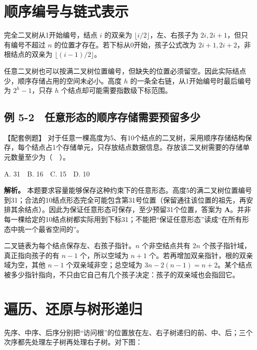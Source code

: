 \section{顺序编号与链式表示}\label{DS05-03}

完全二叉树从1开始编号，结点 \(i\) 的双亲为 \(\lfloor i/2\rfloor\)，左、右孩子为 \(2i,2i+1\)，但只有编号不超过 \(n\) 的位置才存在。若下标从0开始，孩子公式改为 \(2i+1,2i+2\)，非根结点的双亲为 \(\lfloor(i-1)/2\rfloor\)。

任意二叉树也可以按满二叉树位置编号，但缺失的位置必须留空。因此实际结点少，顺序存储占用的空间未必小。高度 \(h\) 的一条全右链，从1开始编号时最后编号为 \(2^h-1\)，只存 \(h\) 个结点却可能需要指数级下标范围。

\subsection{例 5-2　任意形态的顺序存储需要预留多少}\label{DS05-ex2}

\begin{example}[配套案例]

【配套例题】 对于任意一棵高度为5、有10个结点的二叉树，采用顺序存储结构保存，每个结点占1个存储单元，只存放结点数据信息。存放该二叉树需要的存储单元数量至少为（　）。

A. 31　B. 16　C. 15　D. 10

\end{example}

\textbf{解析。} 本题要求容量能够保存这种约束下的任意形态。高度5的满二叉树位置编号到31；合法的10结点形态完全可能包含第31号位置（保留通往该位置的祖先，再安排其余结点）。因此为保证任意形态可保存，至少预留31个位置，答案为 \textbf{A}。并非每一棵给定的10结点树都实际用到下标31；不能把``保证任意形态''读成``在所有形态中挑一个最省空间的''。

二叉链表为每个结点保存左、右孩子指针。\(n\) 个非空结点共有 \(2n\) 个孩子指针域，真正指向孩子的有 \(n-1\) 个，所以空域为 \(n+1\) 个。若再增加双亲指针，根的双亲域为空，其他 \(n-1\) 个双亲域非空；总空域为 \(3n-2(n-1)=n+2\)。某个结点被多少指针指向，不只由它自己有几个孩子决定：孩子的双亲域也会指回它。

\section{遍历、还原与树形递归}\label{DS05-04}

先序、中序、后序分别把``访问根''的位置放在左、右子树递归的前、中、后；三个次序都先处理左子树再处理右子树。对下图：

